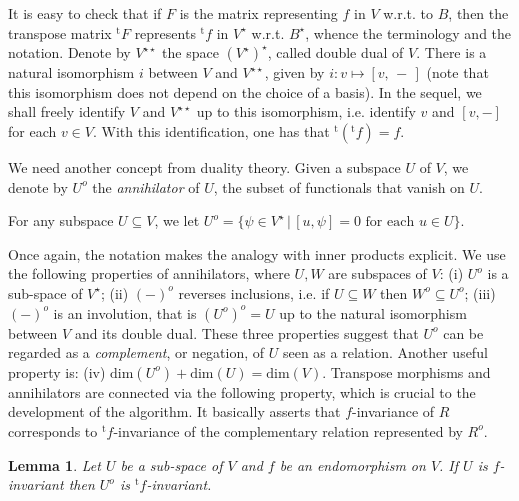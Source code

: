 \documentclass[3p]{elsarticle}
\newcommand{\dimn}{\mathrm{dim}}   %
\newcommand{\transp}{{}^{\mathrm{t}}}  %
\newcommand{\dual}[1]{ {#1}^\star}     %
\newcommand{\ddual}[1]{{#1}^{\star\star}}  %
\newcommand{\ann}{o}                    %
\newcommand{\mik}[1]{\marginpar{ \textbf{MiB:} {\footnotesize #1}}} %
\newtheorem{lemma}{Lemma}
\begin{document}
It is easy  to check that  if $F$ is the matrix representing
$f$ in $V$ w.r.t. to $B$, then the transpose matrix $\transp F$
represents   $\transp f$ in $\dual V$ w.r.t. $\dual B$, whence the
terminology and the notation.
 Denote by
$\ddual V$ the space $\dual{(\dual V)}$, called double dual of $V$.
There is a natural isomorphism $i$ between $V$ and $\ddual V$, given
by $i \colon v\mapsto [v,\,-\,]$ (note that this isomorphism does
not depend on the choice of a basis). In the sequel, we shall freely
identify  $V$ and $\ddual V$ up to this isomorphism, i.e. identify
$v$ and $[v,-]$ for each $v\in V$. With this identification, one has
that $\transp(\transp f)=f$.

We need another concept from duality theory. Given a subspace $U$ of
$V$, we denote by $U^\ann$ the \emph{annihilator} of $U$, the subset
of functionals that vanish on $U$.

 \begin{definition}[annihilator]
 For any subspace $U\subseteq V$,
 we let $U^\ann= \{\psi\in \dual V\,|\, [u,\psi]=0\mbox{ for each } u\in U\}$.
  \end{definition}

Once again,  the   notation makes the analogy   with   inner
products explicit. We use the following properties of annihilators,
where $U,W$ are subspaces of $V$: (i) $U^\ann$ is a sub-space of
$\dual V$; (ii) $(-)^\ann$ reverses inclusions, i.e. if $U\subseteq
W$ then $W^\ann\subseteq U^\ann$; (iii) $(-)^\ann$ is an involution,
that is $(U^\ann)^\ann=U$  up to the natural isomorphism between $V$
and its double dual. These three properties suggest that $U^\ann$
can be regarded as a \emph{complement}, or negation, of $U$ seen as
a relation. Another useful property is: (iv)
$\dimn(U^\ann)+\dimn(U)=\dimn(V)$. Transpose morphisms and
annihilators  are connected via the following  property, which is
crucial to the development of the algorithm. It basically asserts
that $f$-invariance of $R$ corresponds to $\transp f$-invariance of
the complementary relation represented by $R^\ann$.

\begin{lemma}\label{lemma:Transp}
Let $U$ be a sub-space of $V$ and $f$ be an endomorphism on $V$. If
$U$ is $f$-invariant then $U^\ann$ is  $\transp f$-invariant.
\end{lemma}
\end{document}
